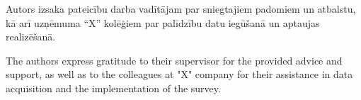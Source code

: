 \frontmatterpage
{}
Autors izsaka pateicību darba vadītājam par sniegtajiem padomiem un atbalstu, kā arī uzņēmuma “X” kolēģiem par palīdzību datu iegūšanā un aptaujas realizēšanā.

The authors express gratitude to their supervisor for the provided advice and support, as well as to the colleagues at "X" company for their assistance in data acquisition and the implementation of the survey.